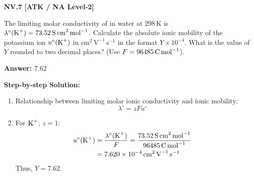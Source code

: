 \begin{problembox}
\textbf{NV.7} \hfill \textbf{[ATK / NA Level-2]}

The limiting molar conductivity of  in water at $298\,\text{K}$ is $\lambda^\circ(\ce{K+}) = 73.52\,\text{S\,cm}^2\,\text{mol}^{-1}$. Calculate the absolute ionic mobility of the potassium ion $u^\circ(\ce{K+})$ in $\text{cm}^2\,\text{V}^{-1}\,\text{s}^{-1}$ in the format $Y \times 10^{-4}$. What is the value of $Y$ rounded to two decimal places? (Use $F = 96485\,\text{C\,mol}^{-1}$).
\end{problembox}
\begin{solution}
\textbf{Answer: $7.62$}

\textbf{Step-by-step Solution:}
\begin{enumerate}
    \item Relationship between limiting molar ionic conductivity and ionic mobility:
    \begin{equation*}
        \lambda^\circ = z F u^\circ
    \end{equation*}
    \item For $\ce{K+}$, $z = 1$:
    \begin{align*}
        u^\circ(\ce{K+}) &= \frac{\lambda^\circ(\ce{K+})}{F} = \frac{73.52\,\text{S\,cm}^2\,\text{mol}^{-1}}{96485\,\text{C\,mol}^{-1}} \\
        &= 7.620 \times 10^{-4}\,\text{cm}^2\,\text{V}^{-1}\,\text{s}^{-1}
    \end{align*}
    Thus, $Y = 7.62$.
\end{enumerate}
\end{solution}

